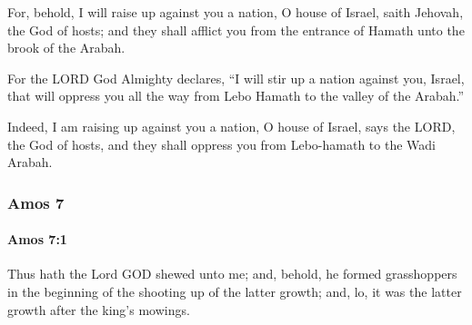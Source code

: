 			\begin{versebox}
					\item[BHS] 
					\item[LXX] 
					\item[ASV] For, behold, I will raise up against you a nation, O house of Israel, saith Jehovah, the God of hosts; and they shall afflict you from the entrance of Hamath unto the brook of the Arabah.
					\item[NIV] For the LORD God Almighty declares, “I will stir up a nation against you, Israel, that will oppress you all the way from Lebo Hamath to the valley of the Arabah.”
					\item[NRSV] Indeed, I am raising up against you a nation, O house of Israel, says the LORD, the God of hosts, and they shall oppress you from Lebo-hamath to the Wadi Arabah.
			\end{versebox}
	\subsubsection{Amos 7} %
		\label{AMOS-7}

		\paragraph{Amos 7:1} %
			\label{AMOS-7-1}

			Thus hath the Lord GOD shewed unto me; and, behold, he formed grasshoppers in the beginning of the shooting up of the latter growth; and, lo, it was the latter growth after the king’s mowings.

